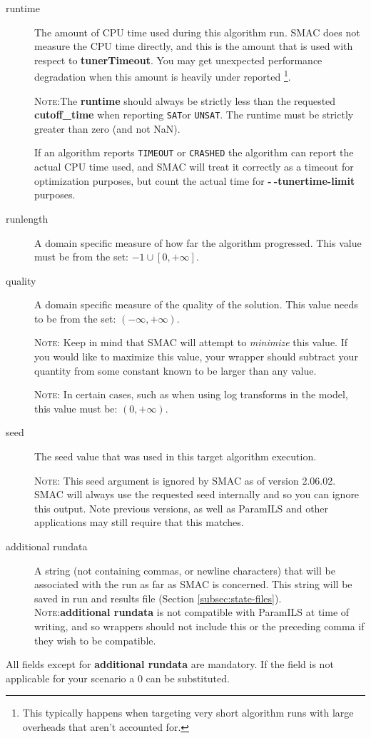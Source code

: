 \documentclass[manual.tex]{subfiles}
\begin{document}
\begin{description}
\item [{runtime}] The amount of CPU time used during this algorithm run.
SMAC does not measure the CPU time directly, and this is the amount
that is used with respect to \textbf{tunerTimeout}. You may get
unexpected performance degradation when this amount is heavily under
reported \footnote{This typically happens when targeting very short algorithm
runs with large overheads that aren't accounted for.}. 

\textsc{Note:}The \textbf{runtime }should always be strictly less
than the requested \textbf{cutoff\_time } when reporting \texttt{SAT}or \texttt{UNSAT}. The runtime must be strictly greater than zero (and not NaN).

If an algorithm reports \texttt{TIMEOUT} or \texttt{CRASHED} the algorithm can report the actual CPU time used, and SMAC will treat it correctly as a timeout for optimization purposes, but count the actual time for \textbf{-$\!~$-tunertime-limit} purposes.

\item [{runlength}] A domain specific measure of how far the algorithm
progressed. This value must be from the set: ${-1} \cup [0,+\infty]$.

\item [{quality}] A domain specific measure of the quality of the solution. This value needs to be 
from the set: $(-\infty, +\infty)$. 

\textsc{Note:} Keep in mind that SMAC will attempt to \emph{minimize} this value. If you would like to maximize this value, your wrapper should subtract your quantity from some constant known to be larger than any value.

\textsc{Note}: In certain cases, such as when using log transforms in the model, this value must be: $(0, +\infty)$.

\item [{seed}] The seed value that was used in this target algorithm execution.


\textsc{Note:} This seed argument is ignored by SMAC as of version 2.06.02. SMAC will always use the requested seed internally and so you can ignore this output.  Note previous versions, as well as ParamILS and other applications may still require that this matches.

\item[{additional rundata}] A string (not containing commas, or newline characters) that will be associated with the run as far as SMAC is concerned. This string will be saved in run and results file (Section \ref{subsec:state-files}). \\
\textsc{Note}:\textbf{additional rundata} is not compatible with ParamILS at time of writing, and so wrappers should not include this or the preceding comma if they wish to be compatible.


\end{description}
All fields except for \textbf{additional rundata} are mandatory. If the field is not applicable for your scenario a 0 can be substituted.
\end{document}
